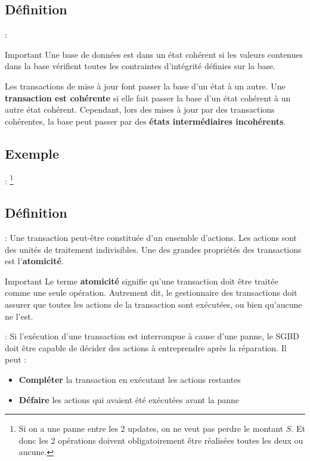\documentclass[10pt]{beamer}
\begin{document}
\subsection{Définition}
\begin{frame}{\secname : \subsecname}
    \begin{alertblock}{Important}
        Une base de données est dans un état cohérent si les valeurs contenues dans la base vérifient toutes les contraintes d'intégrité définies sur la base.
    \end{alertblock}
    Les transactions de mise à jour font passer la base d'un état à un autre.
    Une \textbf{transaction est cohérente} si elle fait passer la base d'un état cohérent à un autre état cohérent.
    Cependant, lors des mises à jour par des transactions cohérentes, la base peut passer par des \textbf{états intermédiaires incohérents}.
\end{frame}
\subsection{Exemple}
\begin{frame}{\secname : \subsecname}
    \footnote{Si on a une panne entre les 2 updates, on ne veut pas perdre le montant $S$. Et donc les 2 opérations doivent obligatoirement être réalisées toutes les deux ou aucune.}
\end{frame}
\subsection{Définition}
\begin{frame}{\secname : \subsecname}
    Une transaction peut-être constituée d'un ensemble d'actions.  Les actions sont des unités de traitement indivisibles.
    Une des grandes propriétés des transactions est l'\textbf{atomicité}.
    \begin{alertblock}{Important}
        Le terme \textbf{atomicité} signifie qu'une transaction doit être traitée comme une seule opération.
        Autrement dit, le gestionnaire des transactions doit assurer que toutes les actions de la transaction sont exécutées, ou bien qu'aucune ne l'est.
    \end{alertblock}
\end{frame}

\begin{frame}{\secname : \subsecname}
    Si l'exécution d'une transaction est interrompue à cause d'une panne, le SGBD doit être capable de décider des actions à entreprendre après la réparation.
    Il peut :
    \begin{itemize}
        \item \textbf{Compléter} la transaction en exécutant les actions restantes
        \item \textbf{Défaire} les actions qui avaient été exécutées avant la panne
    \end{itemize}
\end{frame}
\end{document}
